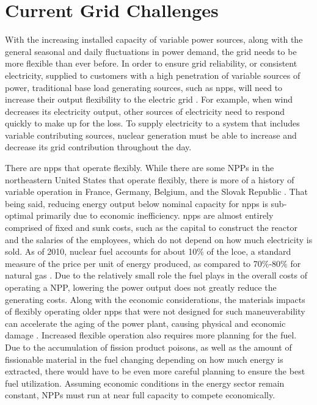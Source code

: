 \section{Current Grid Challenges}
With the increasing installed capacity of variable power sources, along with the general seasonal and daily fluctuations in power demand, the grid needs to be more flexible than ever before. In order to ensure grid reliability, or consistent electricity, supplied to customers with a high penetration of variable sources of power, traditional base load generating sources, such as \ac{npp}s, will need to increase their output flexibility to the electric grid \cite {Denholm2011}. For example, when wind decreases its electricity output, other sources of electricity need to respond quickly to make up for the loss. To supply electricity to a system that includes variable contributing sources, nuclear generation must be able to increase and decrease its grid contribution throughout the day.

There are \ac{npp}s that operate flexibly.  While there are some NPPs in the northeastern United States that operate flexibly, there is more of a history of variable operation in France, Germany, Belgium, and the Slovak Republic \cite{Jenkins2018}. That being said, reducing energy output below nominal capacity for \ac{npps} is sub-optimal primarily due to economic inefficiency\cite{Nuclear2011}. \ac{npps} are almost entirely comprised of fixed and sunk costs, such as the capital to construct the reactor and the salaries of the employees, which do not depend on how much electricity is sold. As of 2010, nuclear fuel accounts for about 10\% of the \ac{lcoe}, a standard measure of the price per unit of energy produced, as compared to 70\%-80\% for natural gas \cite{IEA/NEA}. Due to the relatively small role the fuel plays in the overall costs of operating a NPP, lowering the power output does not greatly reduce the generating costs. Along with the economic considerations, the materials impacts  of flexibly operating older \ac{npp}s that were not designed for such maneuverability can accelerate the aging of the power plant, causing physical and economic damage \cite{Nuclear2011}. Increased flexible operation also requires more planning for the fuel.  Due to the accumulation of fission product poisons, as well as the amount of fissionable material in the fuel changing depending on how much energy is extracted, there would have to be even more careful planning to ensure the best fuel utilization. Assuming economic conditions in the energy sector remain constant, NPPs must run at near full capacity to compete economically.



